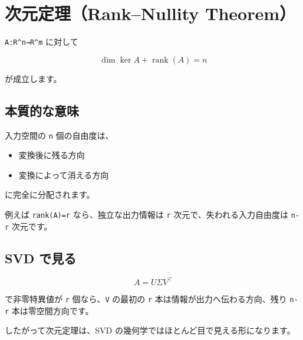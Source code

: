 \documentclass[
  11pt,
  a4paper,
]{ltjsarticle}
\author{}
\date{}
\providecommand{\tightlist}{%
  \setlength{\itemsep}{0pt}\setlength{\parskip}{0pt}}
\begin{document}
\hypertarget{ux6b21ux5143ux5b9aux7406ranknullity-theorem}{%
\section{次元定理（Rank--Nullity
Theorem）}\label{ux6b21ux5143ux5b9aux7406ranknullity-theorem}}

\texttt{A:R\^{}n→R\^{}m} に対して

\[
\boxed{\dim\ker A+\operatorname{rank}(A)=n}
\]

が成立します。

\hypertarget{ux672cux8ceaux7684ux306aux610fux5473}{%
\subsection{本質的な意味}\label{ux672cux8ceaux7684ux306aux610fux5473}}

入力空間の \texttt{n} 個の自由度は、

\begin{itemize}
\tightlist
\item
  変換後に残る方向
\item
  変換によって消える方向
\end{itemize}

に完全に分配されます。

例えば \texttt{rank(A)=r} なら、独立な出力情報は \texttt{r}
次元で、失われる入力自由度は \texttt{n-r} 次元です。

\hypertarget{svd-ux3067ux898bux308b}{%
\subsection{SVD で見る}\label{svd-ux3067ux898bux308b}}

\[
A=U\Sigma V^\top
\]

で非零特異値が \texttt{r} 個なら、\texttt{V} の最初の \texttt{r}
本は情報が出力へ伝わる方向、残り \texttt{n-r} 本は零空間方向です。

したがって次元定理は、SVD の幾何学ではほとんど目で見える形になります。
\end{document}
